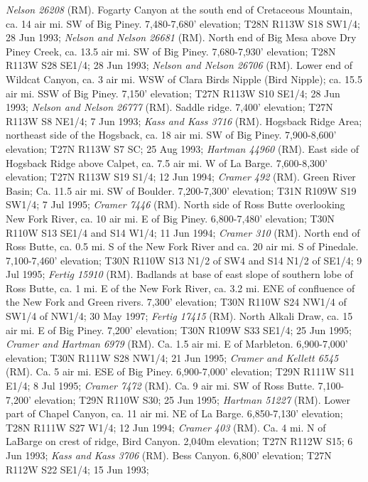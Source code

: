 \textit{Nelson 26208} (RM).
Fogarty Canyon at the south end of Cretaceous Mountain, ca. 14 air mi. SW of
Big Piney. 7,480-7,680’ elevation; T28N R113W S18 SW1/4; 28 Jun 1993;
\textit{Nelson and Nelson 26681} (RM).
North end of Big Mesa above Dry Piney Creek, ca. 13.5 air mi. SW of Big Piney.
7,680-7,930' elevation; T28N R113W S28	SE1/4; 28 Jun 1993;
\textit{Nelson and Nelson 26706} (RM).
Lower end of Wildcat Canyon, ca. 3 air mi. WSW of Clara Birds Nipple
(Bird Nipple); ca. 15.5 air mi. SSW of Big Piney. 7,150’ elevation;
T27N R113W S10 SE1/4; 28 Jun 1993; \textit{Nelson and Nelson 26777} (RM).
Saddle ridge. 7,400’ elevation; T27N R113W S8 NE1/4; 7 Jun 1993;
\textit{Kass and Kass 3716} (RM).
Hogsback Ridge Area; northeast side of the Hogsback, ca. 18 air mi. SW of
Big Piney. 7,900-8,600’ elevation; T27N R113W S7 SC; 25 Aug 1993;
\textit{Hartman 44960} (RM).
East side of Hogsback Ridge above Calpet, ca. 7.5 air mi. W of La Barge.
7,600-8,300’ elevation; T27N R113W S19 S1/4; 12 Jun 1994;
\textit{Cramer 492} (RM).
Green River Basin; Ca. 11.5 air mi. SW of Boulder. 7,200-7,300’ elevation;
T31N R109W S19 SW1/4; 7 Jul 1995; \textit{Cramer 7446} (RM).
North side of Ross Butte overlooking New Fork River, ca. 10 air mi. E of
Big Piney. 6,800-7,480’ elevation; T30N R110W S13 SE1/4 and S14 W1/4;
11 Jun 1994; \textit{Cramer 310} (RM).
North end of Ross Butte, ca. 0.5 mi. S of the New Fork River and ca. 20 air mi.
S of Pinedale. 7,100-7,460’ elevation; T30N R110W S13 N1/2 of SW4 and S14 N1/2
of SE1/4; 9 Jul 1995; \textit{Fertig 15910} (RM).
Badlands at base of east slope of southern lobe of Ross Butte, ca. 1 mi. E of
the New Fork River, ca. 3.2 mi. ENE of confluence of the New Fork and Green
rivers. 7,300’ elevation; T30N R110W S24 NW1/4 of SW1/4 of NW1/4; 30 May 1997;
\textit{Fertig 17415} (RM).
North Alkali Draw, ca. 15 air mi. E of Big Piney. 7,200’ elevation;
T30N R109W S33 SE1/4; 25 Jun 1995; \textit{Cramer and Hartman 6979} (RM).
Ca. 1.5 air mi. E of Marbleton. 6,900-7,000’ elevation; T30N R111W S28 NW1/4;
21 Jun 1995; \textit{Cramer and Kellett 6545} (RM).
Ca. 5 air mi. ESE of Big Piney. 6,900-7,000’ elevation; T29N R111W S11 E1/4;
8 Jul 1995; \textit{Cramer 7472} (RM).
Ca. 9 air mi. SW of Ross Butte. 7,100-7,200’ elevation; T29N R110W S30;
25 Jun 1995; \textit{Hartman 51227} (RM).
Lower part of Chapel Canyon, ca. 11 air mi. NE of La Barge.
6,850-7,130’ elevation; T28N R111W S27 W1/4; 12 Jun 1994;
\textit{Cramer 403} (RM).
Ca. 4 mi. N of LaBarge on crest of ridge, Bird Canyon. 2,040m elevation;
T27N R112W S15; 6 Jun 1993; \textit{Kass and Kass 3706} (RM).
Bess Canyon. 6,800’ elevation; T27N R112W S22 SE1/4; 15 Jun 1993;
